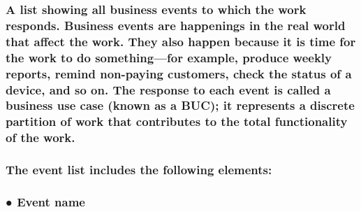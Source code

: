 \documentclass[
]{article}
\begin{document}
\hypertarget{a-list-showing-all-business-events-to-which-the-work-responds.-business-events-are-happenings-in-the-real-world-that-affect-the-work.-they-also-happen-because-it-is-time-for-the-work-to-do-somethingfor-example-produce-weekly-reports-remind-non-paying-customers-check-the-status-of-a-device-and-so-on.-the-response-to-each-event-is-called-a-business-use-case-known-as-a-buc-it-represents-a-discrete-partition-of-work-that-contributes-to-the-total-functionality-of-the-work.}{%
\subsubsection{\texorpdfstring{A list showing all business events to
which the work responds. Business events are happenings in the real
world that affect the work. They also happen because it is time for the
work to do something---for example, produce weekly reports, remind
non-paying customers, check the status of a device, and so on. The
response to each event is called a business use case (known as a BUC);
it represents a discrete partition of work that contributes to the total
functionality of the work.
}{A list showing all business events to which the work responds. Business events are happenings in the real world that affect the work. They also happen because it is time for the work to do something---for example, produce weekly reports, remind non-paying customers, check the status of a device, and so on. The response to each event is called a business use case (known as a BUC); it represents a discrete partition of work that contributes to the total functionality of the work. }}\label{a-list-showing-all-business-events-to-which-the-work-responds.-business-events-are-happenings-in-the-real-world-that-affect-the-work.-they-also-happen-because-it-is-time-for-the-work-to-do-somethingfor-example-produce-weekly-reports-remind-non-paying-customers-check-the-status-of-a-device-and-so-on.-the-response-to-each-event-is-called-a-business-use-case-known-as-a-buc-it-represents-a-discrete-partition-of-work-that-contributes-to-the-total-functionality-of-the-work.}}

\hypertarget{the-event-list-includes-the-following-elements}{%
\subsubsection{The event list includes the following
elements:}\label{the-event-list-includes-the-following-elements}}

\hypertarget{event-name}{%
\subsubsection{● Event name}\label{event-name}}
\end{document}
